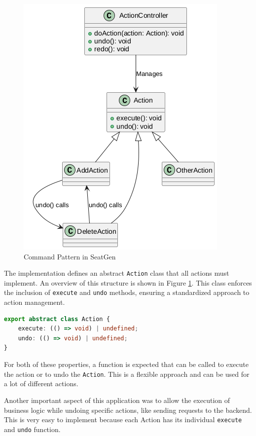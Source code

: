 \begin{figure}
    \centering
    \includegraphics[scale=0.5]{pics/command-pattern.png}
    \caption{Command Pattern in SeatGen}
    \label{fig:command-pattern}
\end{figure}

The implementation defines an abstract \texttt{Action} class that all actions must implement. An overview of this structure is shown in Figure \ref{fig:command-pattern}. This class enforces the inclusion of \texttt{execute} and \texttt{undo} methods, ensuring a standardized approach to action management.

\begin{lstlisting}[language=TypeScript,caption={Action class},label={lst:action-class}]
export abstract class Action {
    execute: (() => void) | undefined;
    undo: (() => void) | undefined;
}
\end{lstlisting}

For both of these properties, a function is expected that can be called to execute the action or to undo the \texttt{Action}. This is a flexible approach and can be used for a lot of different actions. 

Another important aspect of this application was to allow the execution of business logic while undoing specific actions, like sending requests to the backend. This is very easy to implement because each Action has its individual \texttt{execute} and \texttt{undo} function.

